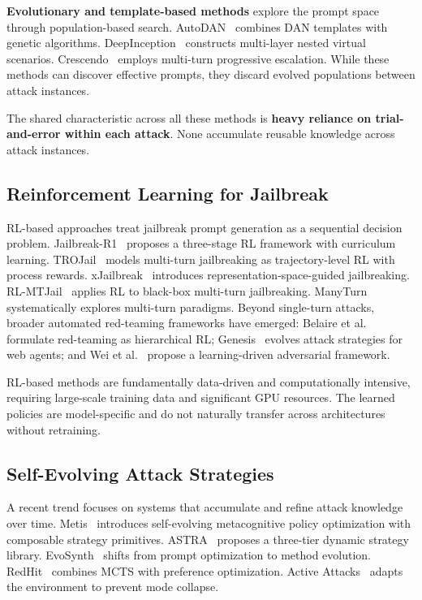 \documentclass[letterpaper]{article}
\begin{document}
\textbf{Evolutionary and template-based methods} explore the prompt space through population-based search. AutoDAN~\citep{liu2023autodan} combines DAN templates with genetic algorithms. DeepInception~\citep{li2023deepinception} constructs multi-layer nested virtual scenarios. Crescendo~\citep{russinovich2024crescendo} employs multi-turn progressive escalation. While these methods can discover effective prompts, they discard evolved populations between attack instances.


The shared characteristic across all these methods is \textbf{heavy reliance on trial-and-error within each attack}. None accumulate reusable knowledge across attack instances.

\subsection{Reinforcement Learning for Jailbreak}

RL-based approaches treat jailbreak prompt generation as a sequential decision problem. Jailbreak-R1~\citep{guo2025jailbreakr1} proposes a three-stage RL framework with curriculum learning. TROJail~\citep{xiong2026trojail} models multi-turn jailbreaking as trajectory-level RL with process rewards. xJailbreak~\citep{lee2025xjailbreak} introduces representation-space-guided jailbreaking. RL-MTJail~\citep{chen2025rlmtjail} applies RL to black-box multi-turn jailbreaking. ManyTurn~\citep{yang2025manyturn} systematically explores multi-turn paradigms. Beyond single-turn attacks, broader automated red-teaming frameworks have emerged: Belaire et al.~\citep{belaire2025automatic} formulate red-teaming as hierarchical RL; Genesis~\citep{zhang2025genesis} evolves attack strategies for web agents; and Wei et al.~\citep{wei2025learning} propose a learning-driven adversarial framework.

RL-based methods are fundamentally data-driven and computationally intensive, requiring large-scale training data and significant GPU resources. The learned policies are model-specific and do not naturally transfer across architectures without retraining.

\subsection{Self-Evolving Attack Strategies}

A recent trend focuses on systems that accumulate and refine attack knowledge over time. Metis~\citep{chen2026metis} introduces self-evolving metacognitive policy optimization with composable strategy primitives. ASTRA~\citep{liu2026astra} proposes a three-tier dynamic strategy library. EvoSynth~\citep{chen2025evosynth} shifts from prompt optimization to method evolution. RedHit~\citep{sorkhpour2025redhit} combines MCTS with preference optimization. Active Attacks~\citep{yun2025active} adapts the environment to prevent mode collapse.
\end{document}
